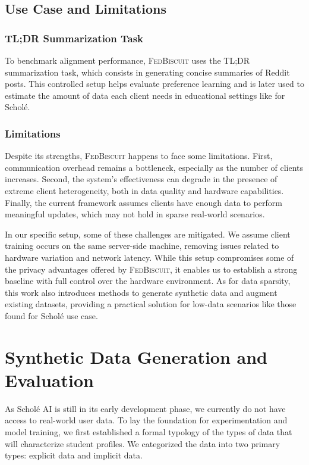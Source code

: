 \documentclass[sigconf]{acmart}
\begin{document}
\subsection{Use Case and Limitations} 
\subsubsection{TL;DR Summarization Task} To benchmark alignment performance, \textsc{FedBiscuit} uses the TL;DR summarization task, which consists in generating concise summaries of Reddit posts. This controlled setup helps evaluate preference learning and is later used to estimate the amount of data each client needs in educational settings like for Schol\'e.

\subsubsection{Limitations} 
Despite its strengths, \textsc{FedBiscuit} happens to face some limitations. First, communication overhead remains a bottleneck, especially as the number of clients increases. Second, the system's effectiveness can degrade in the presence of extreme client heterogeneity, both in data quality and hardware capabilities. Finally, the current framework assumes clients have enough data to perform meaningful updates, which may not hold in sparse real-world scenarios. 

In our specific setup, some of these challenges are mitigated. We assume client training occurs on the same server-side machine, removing issues related to hardware variation and network latency. While this setup compromises some of the privacy advantages offered by \textsc{FedBiscuit}, it enables us to establish a strong baseline with full control over the hardware environment. As for data sparsity, this work also introduces methods to generate synthetic data and augment existing datasets, providing a practical solution for low-data scenarios like those found for Schol\'e use case.


\section{Synthetic Data Generation and Evaluation}

As Schol\'e AI is still in its early development phase, we currently do not have access to real-world user data. To lay the foundation for experimentation and model training, we first established a formal typology of the types of data that will characterize student profiles. We categorized the data into two primary types: explicit data and implicit data.
\end{document}
